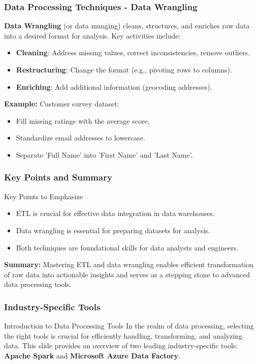 \documentclass[aspectratio=169]{beamer}
\begin{document}
\begin{frame}[fragile]
    \frametitle{Data Processing Techniques - Data Wrangling}
    \textbf{Data Wrangling} (or data munging) cleans, structures, and enriches raw data into a desired format for analysis. Key activities include:
    \begin{itemize}
        \item \textbf{Cleaning}: Address missing values, correct inconsistencies, remove outliers.
        \item \textbf{Restructuring}: Change the format (e.g., pivoting rows to columns).
        \item \textbf{Enriching}: Add additional information (geocoding addresses).
    \end{itemize}

    \textbf{Example:} Customer survey dataset:
    \begin{itemize}
        \item Fill missing ratings with the average score.
        \item Standardize email addresses to lowercase.
        \item Separate 'Full Name' into 'First Name' and 'Last Name'.
    \end{itemize}
\end{frame}

\begin{frame}[fragile]
    \frametitle{Key Points and Summary}
    \begin{block}{Key Points to Emphasize}
        \begin{itemize}
            \item ETL is crucial for effective data integration in data warehouses.
            \item Data wrangling is essential for preparing datasets for analysis.
            \item Both techniques are foundational skills for data analysts and engineers.
        \end{itemize}
    \end{block}

    \textbf{Summary:} Mastering ETL and data wrangling enables efficient transformation of raw data into actionable insights and serves as a stepping stone to advanced data processing tools.
\end{frame}

\begin{frame}
  \frametitle{Industry-Specific Tools}
  \begin{block}{Introduction to Data Processing Tools}
  In the realm of data processing, selecting the right tools is crucial for efficiently handling, transforming, and analyzing data. This slide provides an overview of two leading industry-specific tools: \textbf{Apache Spark} and \textbf{Microsoft Azure Data Factory}.
  \end{block}
\end{frame}
\end{document}
